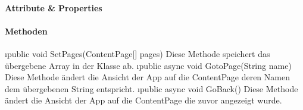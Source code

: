 \documentclass[../entwurf.tex]{subfiles}
\begin{document}
\paragraph{Attribute \& Properties}
\paragraph{Methoden}
\begin{itemize}
	\i{public void SetPages(ContentPage[] pages)} Diese Methode speichert das übergebene Array in der Klasse ab.
	\i{public async void GotoPage(String name)} Diese Methode ändert die Ansicht der App auf die ContentPage deren Namen dem übergebenen String entspricht.
	\i{public async void GoBack()} Diese Methode ändert die Ansicht der App auf die ContentPage die zuvor angezeigt wurde.
\end{itemize}
\end{document}
